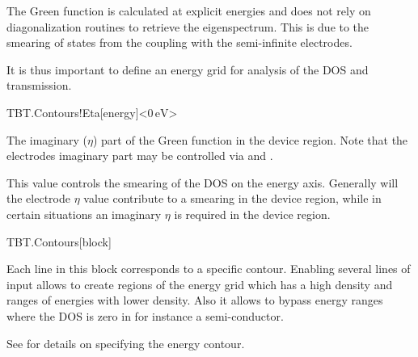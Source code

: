 The Green function is calculated at explicit energies and does not
rely on diagonalization routines to retrieve the eigenspectrum. This
is due to the smearing of states from the coupling with the
semi-infinite electrodes.

It is thus important to define an energy grid for analysis of the DOS
and transmission.

\begin{fdfentry}{TBT.Contours!Eta}[energy]<$0\,\mathrm{eV}$>
  
  The imaginary ($\eta$) part of the Green function in the device
  region. Note that the electrodes imaginary part may be controlled
  via  and .

  This value controls the smearing of the DOS on the energy
  axis. Generally will the electrode $\eta$ value contribute to a
  smearing in the device region, while in certain situations an
  imaginary $\eta$ is required in the device region. 
  
\end{fdfentry}

\begin{fdfentry}{TBT.Contours}[block]

  Each line in this block corresponds to a specific contour.
  Enabling several lines of input allows to create regions of the
  energy grid which has a high density and ranges of energies with
  lower density. Also it allows to bypass energy ranges where the DOS
  is zero in for instance a semi-conductor.  

  See  for details on specifying the energy contour.
  
\end{fdfentry}

